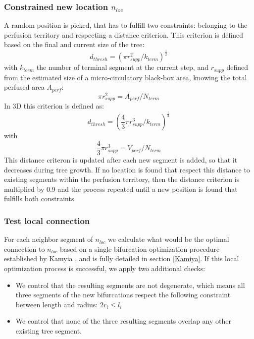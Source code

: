 \documentclass[a4paper, 11pt]{article} %
\begin{document}
\subsubsection{Constrained new location $n_{loc}$}
A random position is picked, that has to fulfill two constraints: belonging to the perfusion territory and respecting a distance criterion. 
This criterion is defined based on the final and current size of the tree:
\begin{equation}
d_{thresh} = (\pi r_{supp}^2 / k_{term})^\frac{1}{2}
\end{equation}
with $k_{term}$ the number of terminal segment at the current step, and $r_{supp}$ defined from  the estimated size of a micro-circulatory black-box area, knowing the total perfused area $A_{perf}$:
\begin{equation}
\pi r_{supp}^2 = A_{perf} / N_{term}
\end{equation}
In 3D this criterion is defined as:
\begin{equation}
d_{thresh} = (\frac{4}{3} \pi r_{supp}^3 / k_{term})^\frac{1}{3}
\end{equation}
with
\begin{equation}
\frac{4}{3}\pi r_{supp}^3 = V_{perf} / N_{term}
\end{equation}
This distance criteron is updated after each new segment is added, so that it decreases during tree growth. If no location is found that respect this distance to existing segments within the perfusion territory, then the distance criterion is multiplied by 0.9 and the process repeated until a new position is found that fulfills both constraints. 

\subsubsection{Test local connection}

For each neighbor segment of $n_{loc}$ we calculate what would be the optimal connection to $n_{loc}$ based on a single bifurcation optimization procedure established by Kamyia \cite{kamiya1972optimal}, and is fully detailed in section \ref{Kamiya}. If this local optimization process is successful, we apply two additional checks:
\begin{itemize}
\item We control that the resulting segments are not degenerate, which means all three segments of the new bifurcations respect the following constraint between length and radius: $2r_i \leq l_i$

\item We control that none of the three resulting segments overlap any other existing tree segment.
\end{itemize}
\end{document}
